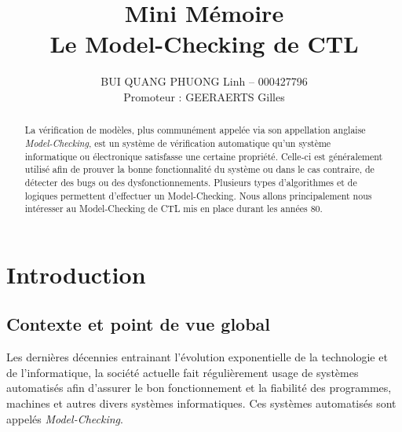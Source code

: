 \documentclass[runningheads,a4paper,11pt]{llncs}
\begin{document}
\mainmatter 

\title{Mini Mémoire \\ Le Model-Checking de CTL}


\author{BUI QUANG PHUONG Linh -- 000427796 \\ Promoteur : GEERAERTS Gilles}



\tocauthor{{}}

\maketitle


\begin{abstract}
La vérification de modèles, plus communément appelée via son appellation anglaise \textit{Model-Checking}, est un système de vérification automatique qu'un système informatique ou électronique satisfasse une certaine propriété. Celle-ci est généralement utilisé afin de prouver la bonne fonctionnalité du système ou dans le cas contraire, de détecter des bugs ou des dysfonctionnements. Plusieurs types d'algorithmes et de logiques permettent d'effectuer un Model-Checking. Nous allons principalement nous intéresser au Model-Checking de CTL mis en place durant les années 80. 
\end{abstract}

\medskip

\begingroup
\let\clearpage\relax
\tableofcontents
\endgroup

\medskip
\medskip

\newpage 

\section{Introduction}

\subsection{Contexte et point de vue global}
\noindent
Les dernières décennies entrainant l'évolution exponentielle de la technologie et de l'informatique, la société actuelle fait régulièrement usage de systèmes automatisés afin d'assurer le bon fonctionnement et la fiabilité des programmes, machines et autres divers systèmes informatiques. Ces systèmes automatisés sont appelés \textit{Model-Checking}. \\  
\end{document}
